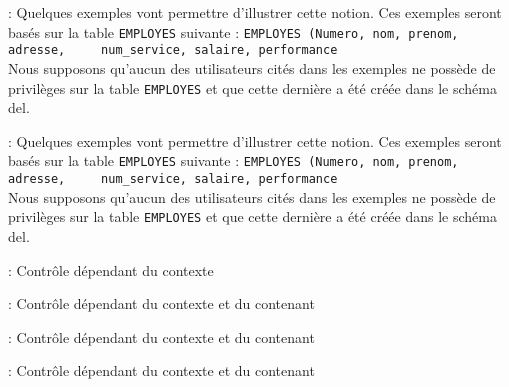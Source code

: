 \documentclass[10pt]{beamer}
\begin{document}
\begin{frame}{\secname : \subsecname}
    Quelques exemples vont permettre d'illustrer cette notion.  Ces exemples seront basés sur la table \lstinline[language=sql]!EMPLOYES! suivante :
    \lstinline[language=sql]!EMPLOYES (Numero, nom, prenom, adresse,
    num_service, salaire, performance!\\
    Nous supposons qu'aucun des utilisateurs cités dans les exemples ne possède de privilèges sur la table \lstinline[language=sql]!EMPLOYES! et que cette dernière a été créée dans le schéma del.
\end{frame}

\begin{frame}{\secname : \subsecname}
    Quelques exemples vont permettre d'illustrer cette notion.  Ces exemples seront basés sur la table \lstinline[language=sql]!EMPLOYES! suivante :
    \lstinline[language=sql]!EMPLOYES (Numero, nom, prenom, adresse,
    num_service, salaire, performance!\\
    Nous supposons qu'aucun des utilisateurs cités dans les exemples ne possède de privilèges sur la table \lstinline[language=sql]!EMPLOYES! et que cette dernière a été créée dans le schéma del.
\end{frame}

\begin{frame}{\secname : \subsecname}
    Contrôle dépendant du contexte
    
\end{frame}

\begin{frame}{\secname : \subsecname}
    Contrôle dépendant du contexte et du contenant
    
\end{frame}

\begin{frame}{\secname : \subsecname}
    Contrôle dépendant du contexte et du contenant
    
\end{frame}

\begin{frame}{\secname : \subsecname}
    Contrôle dépendant du contexte et du contenant
    
\end{frame}
\end{document}
